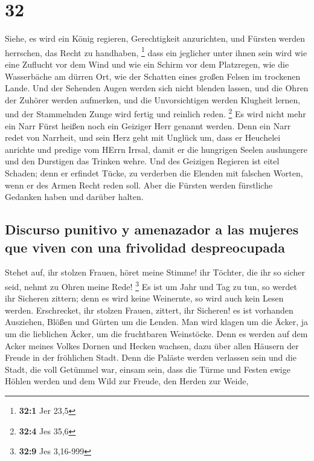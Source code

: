 \hypertarget{section-31}{%
\section{32}\label{section-31}}

 Siehe, es wird ein König regieren, Gerechtigkeit
anzurichten, und Fürsten werden herrschen, das Recht zu handhaben,
\footnote{\textbf{32:1} Jer 23,5}  dass ein jeglicher
unter ihnen sein wird wie eine Zuflucht vor dem Wind und wie ein Schirm
vor dem Platzregen, wie die Wasserbäche am dürren Ort, wie der Schatten
eines großen Felsen im trockenen Lande.  Und der Sehenden
Augen werden sich nicht blenden lassen, und die Ohren der Zuhörer werden
aufmerken,  und die Unvorsichtigen werden Klugheit lernen,
und der Stammelnden Zunge wird fertig und reinlich reden. \footnote{\textbf{32:4}
  Jes 35,6}  Es wird nicht mehr ein Narr Fürst heißen noch
ein Geiziger Herr genannt werden.  Denn ein Narr redet von
Narrheit, und sein Herz geht mit Unglück um, dass er Heuchelei anrichte
und predige vom HErrn Irrsal, damit er die hungrigen Seelen aushungere
und den Durstigen das Trinken wehre.  Und des Geizigen
Regieren ist eitel Schaden; denn er erfindet Tücke, zu verderben die
Elenden mit falschen Worten, wenn er des Armen Recht reden soll.
 Aber die Fürsten werden fürstliche Gedanken haben und
darüber halten.

\hypertarget{discurso-punitivo-y-amenazador-a-las-mujeres-que-viven-con-una-frivolidad-despreocupada}{%
\subsection{Discurso punitivo y amenazador a las mujeres que viven con
una frivolidad
despreocupada}\label{discurso-punitivo-y-amenazador-a-las-mujeres-que-viven-con-una-frivolidad-despreocupada}}

 Stehet auf, ihr stolzen Frauen, höret meine Stimme! ihr
Töchter, die ihr so sicher seid, nehmt zu Ohren meine Rede! \footnote{\textbf{32:9}
  Jes 3,16-999}  Es ist um Jahr und Tag zu tun, so werdet
ihr Sicheren zittern; denn es wird keine Weinernte, so wird auch kein
Lesen werden.  Erschrecket, ihr stolzen Frauen, zittert,
ihr Sicheren! es ist vorhanden Ausziehen, Blößen und Gürten um die
Lenden.  Man wird klagen um die Äcker, ja um die
lieblichen Äcker, um die fruchtbaren Weinstöcke.  Denn es
werden auf dem Acker meines Volkes Dornen und Hecken wachsen, dazu über
allen Häusern der Freude in der fröhlichen Stadt.  Denn
die Paläste werden verlassen sein und die Stadt, die voll Getümmel war,
einsam sein, dass die Türme und Festen ewige Höhlen werden und dem Wild
zur Freude, den Herden zur Weide,

